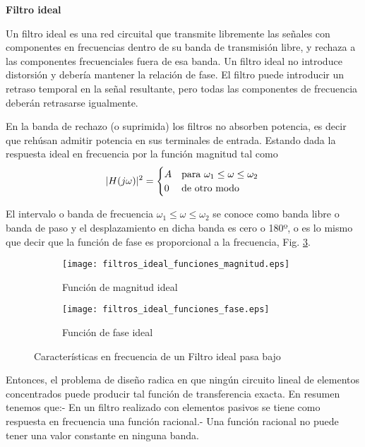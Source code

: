 \documentclass[informe.tex]{subfiles}
\begin{document}
\textbf{Filtro ideal}\newline

Un filtro ideal es una red circuital que transmite libremente las señales con componentes en frecuencias dentro de su banda de transmisión libre, y rechaza a las componentes frecuenciales fuera de esa banda. Un filtro ideal no introduce distorsión y debería mantener la relación de fase.  El filtro puede introducir un retraso temporal en la señal resultante, pero todas las componentes de frecuencia deberán retrasarse igualmente.\newline
 
En la banda de rechazo (o suprimida) los filtros no absorben potencia, es decir que rehúsan admitir potencia en sus terminales de entrada. Estando dada la respuesta ideal en frecuencia por la función magnitud tal como
	$$
	|H(j\omega)|^2 =
	\begin{cases}
		 A  & \mbox{para }\omega_1 \leq \omega \leq \omega_2
		\\
		0       & \mbox{de otro modo }
		\end{cases} \\
	$$

El intervalo o banda de frecuencia $\omega_1 \leq \omega \leq \omega_2 $ se conoce como banda libre o banda de paso y el desplazamiento en dicha banda es cero o 180º, o es lo mismo que decir que la función de fase es proporcional a la frecuencia, Fig. \ref{fig:filtros:ideal:funciones}.\newline

\begin{figure}[h]
     \centering
     \begin{subfigure}[b]{0.5\textwidth}
         \centering
         \texttt{[image: filtros\_ideal\_funciones\_magnitud.eps]}
         \caption{Función de magnitud ideal}
         \label{fig:filtros:ideal:funciones:magnitud}
     \end{subfigure}
     \bigskip
     \begin{subfigure}[b]{0.5\textwidth}
         \centering
         \texttt{[image: filtros\_ideal\_funciones\_fase.eps]}
         \caption{Función de fase ideal}
         \label{fig:filtros:ideal:funciones:fase}
     \end{subfigure}
     \caption{Características en frecuencia de un Filtro ideal pasa bajo}
     \label{fig:filtros:ideal:funciones}
\end{figure}


Entonces, el problema de diseño radica en que ningún circuito lineal de elementos concentrados puede producir tal función de transferencia exacta. En resumen tenemos que:- En un filtro realizado con elementos pasivos se tiene como respuesta en frecuencia una función racional.- Una función racional no puede tener una valor constante en ninguna banda.\newline
\end{document}
